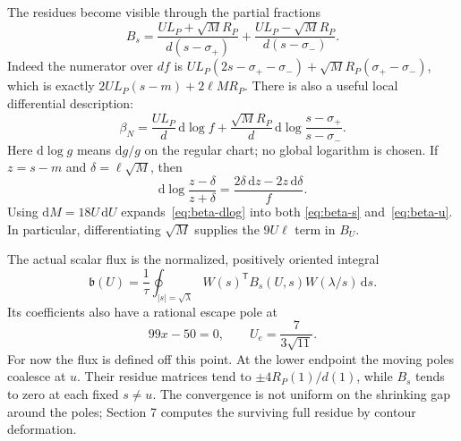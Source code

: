 \documentclass[11pt,a4paper]{article}
\newcommand{\dd}{\mathrm d}
\newcommand{\tr}{\mathsf T}
\begin{document}
The residues become visible through the partial fractions
\begin{equation}\label{eq:beta-partial-fractions}
 B_s=\frac{UL_P+\sqrt M R_P}{d(s-\sigma_+)}
     +\frac{UL_P-\sqrt M R_P}{d(s-\sigma_-)}.
\end{equation}
Indeed the numerator over $df$ is
$UL_P(2s-\sigma_+-\sigma_-)+\sqrt M R_P(\sigma_+-\sigma_-)$,
which is exactly $2UL_P(s-m)+2\ell M R_P$.
There is also a useful local differential description:
\begin{equation}\label{eq:beta-dlog}
 \beta_N=\frac{UL_P}{d}\,\dd\log f
 +\frac{\sqrt M R_P}{d}\,
       \dd\log\frac{s-\sigma_+}{s-\sigma_-}.
\end{equation}
Here $\dd\log g$ means $\dd g/g$ on the regular chart; no global
logarithm is chosen. If $z=s-m$ and $\delta=\ell\sqrt M$, then
\[
 \dd\log\frac{z-\delta}{z+\delta}
   =\frac{2\delta\,\dd z-2z\,\dd\delta}{f}.
\]
Using $\dd M=18U\,\dd U$ expands~\eqref{eq:beta-dlog} into both
\eqref{eq:beta-s} and~\eqref{eq:beta-u}. In particular, differentiating
$\sqrt M$ supplies the $9U\ell$ term in $B_U$.

The actual scalar flux is the normalized, positively oriented integral
\begin{equation}\label{eq:beta-flux}
 \mathfrak b(U)=\frac1\tau\oint_{|s|=\sqrt\lambda}
       W(s)^{\tr}B_s(U,s)W(\lambda/s)\,\dd s.
\end{equation}
Its coefficients also have a rational escape pole at
\begin{equation}\label{eq:escape}
 99x-50=0,\qquad U_e=\frac7{3\sqrt{11}}.
\end{equation}
For now the flux is defined off this point. At the lower endpoint the
moving poles coalesce at $u$. Their residue matrices tend to
$\pm4R_P(1)/d(1)$, while $B_s$ tends to zero at each fixed $s\ne u$.
The convergence is not uniform on the shrinking gap around the poles;
Section 7 computes the surviving full residue by contour deformation.
\end{document}
